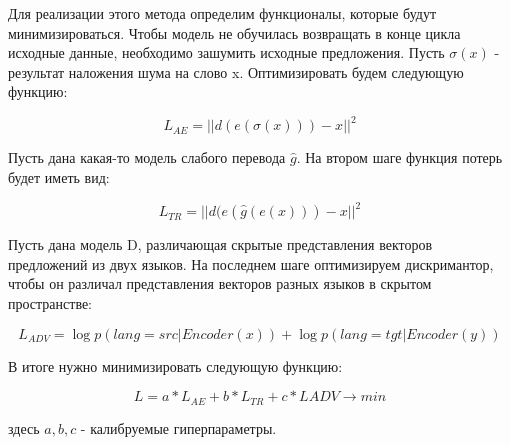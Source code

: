 \documentclass[12pt,twoside]{article}
\begin{document}
    Для реализации этого метода определим функционалы, которые будут минимизироваться. Чтобы модель не обучилась возвращать в конце цикла исходные данные, необходимо зашумить исходные предложения. Пусть $\sigma(x)$ - результат наложения шума на слово x.  Оптимизировать будем  следующую функцию:

    $$L_{AE} = ||d(e(\sigma(x)))-x||^2$$

    Пусть дана какая-то модель слабого перевода $\hat{g}$. На втором шаге  функция потерь будет иметь вид:

    $$L_{TR} = ||d(e(\hat{g}(e(x))) - x||^2$$

    Пусть дана модель D, различающая скрытые представления векторов предложений из двух языков. На последнем шаге оптимизируем дискримантор, чтобы он различал представления векторов разных языков в скрытом пространстве:

    $$L_{ADV} = \log p(lang = src| Encoder(x)) + \log p(lang = tgt|Encoder(y))$$

    В итоге нужно минимизировать следующую функцию:

    $$L = a*L_{AE} + b*L_{TR}+c*L{ADV} \longrightarrow min$$

    здесь $a,b,c$ - калибруемые гиперпараметры.





\end{document}
